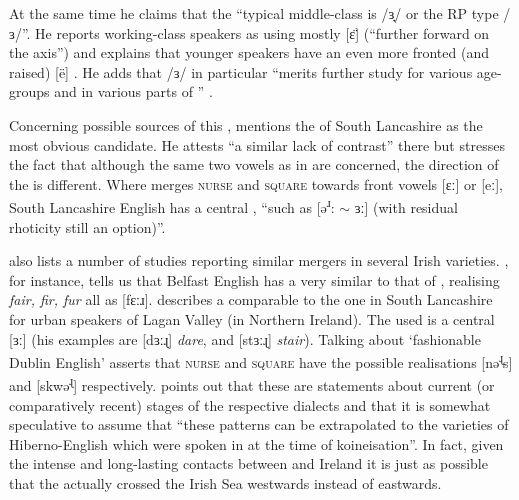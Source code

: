 At the same time he claims that the ``typical middle-class  is /ɜ̟/ or the RP type /ɜ/''. He reports working-class speakers as using mostly [ɛ̈] (``further forward on the axis'') and explains that younger speakers have an even more fronted (and raised) [ë] \citep[271]{knowles1973}.
He adds that /ɜ/ in particular ``merits further study for various age-groups and in various parts of '' \citeyearpar[320]{knowles1973}.

Concerning possible sources of this , \citet[128]{honeybone2007} mentions the  of South Lancashire as the most obvious candidate.
He attests ``a similar lack of contrast'' there but stresses the fact that although the same two vowels as in  are concerned, the direction of the  is different.
Where  merges \textsc{nurse} and \textsc{square} towards front vowels [ɛː] or [eː], South Lancashire English has a central , ``such as [ə\textsuperscript{ɹ}: \(\sim\) ɜː] (with residual rhoticity still an option)''.

\parencite{honeybone2007} also lists a number of studies reporting similar mergers in several Irish varieties.
\citet{wells1982}, for instance, tells us that Belfast English has a  very similar to that of , realising \emph{fair, fir, fur} all as [fɛːɹ].
\citet[cf.][48]{harris1985} describes a  comparable to the one in South Lancashire for urban speakers of Lagan Valley (in Northern Ireland).
The  used is a central [ɜː] (his examples are [dɜːɻ] \emph{dare}, and [stɜːɻ] \emph{stair}).
Talking about `fashionable Dublin English' \citet{hickey1999} asserts that \textsc{nurse} and \textsc{square} have the possible realisations [nə\textsuperscript{ɻ}s] and [skwə\textsuperscript{ɻ}] respectively.
\parencite[128]{honeybone2007} points out that these are statements about current (or comparatively recent) stages of the respective dialects and that it is somewhat speculative to assume that ``these patterns can be extrapolated to the varieties of Hiberno-English which were spoken in  at the time of koineisation''.
In fact, given the intense and long-lasting contacts between  and Ireland it is just as possible that the  actually crossed the Irish Sea westwards instead of eastwards.

